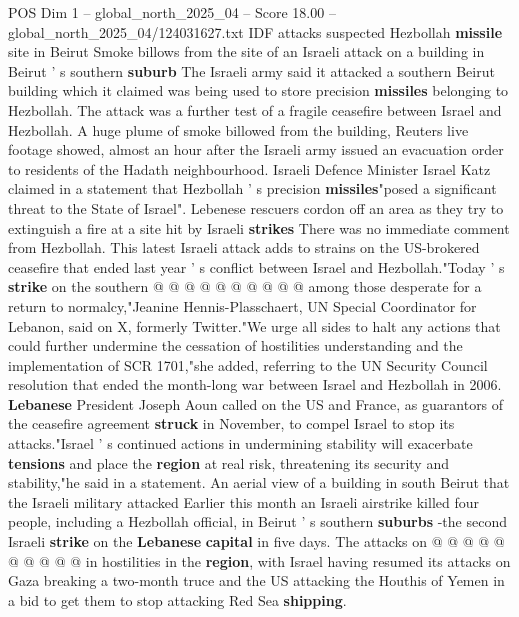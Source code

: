 \begin{textsample}{POS Dim 1 – global\_north\_2025\_04 – Score 18.00 – global\_north\_2025\_04/124031627.txt}  \label{ex:f1_pos_412}
IDF attacks suspected Hezbollah \textbf{missile} site in Beirut Smoke billows from the site of an Israeli attack on a building in Beirut ' s southern \textbf{suburb} The Israeli army said it attacked a southern Beirut building which it claimed was being used to store precision \textbf{missiles} belonging to Hezbollah.
The attack was a further test of a fragile ceasefire between Israel and Hezbollah.
A huge plume of smoke billowed from the building, Reuters live footage showed, almost an hour after the Israeli army issued an evacuation order to residents of the Hadath neighbourhood.
Israeli Defence Minister Israel Katz claimed in a statement that Hezbollah ' s precision \textbf{missiles}"posed a significant threat to the State of Israel".
Lebenese rescuers cordon off an area as they try to extinguish a fire at a site hit by Israeli \textbf{strikes} There was no immediate comment from Hezbollah.
This latest Israeli attack adds to strains on the US-brokered ceasefire that ended last year ' s conflict between Israel and Hezbollah."Today ' s \textbf{strike} on the southern @ @ @ @ @ @ @ @ @ @ among those desperate for a return to normalcy,"Jeanine Hennis-Plasschaert, UN Special Coordinator for Lebanon, said on X, formerly Twitter."We urge all sides to halt any actions that could further undermine the cessation of hostilities understanding and the implementation of SCR 1701,"she added, referring to the UN Security Council resolution that ended the month-long war between Israel and Hezbollah in 2006. \textbf{Lebanese} President Joseph Aoun called on the US and France, as guarantors of the ceasefire agreement \textbf{struck} in November, to compel Israel to stop its attacks."Israel ' s continued actions in undermining stability will exacerbate \textbf{tensions} and place the \textbf{region} at real risk, threatening its security and stability,"he said in a statement.
An aerial view of a building in south Beirut that the Israeli military attacked Earlier this month an Israeli airstrike killed four people, including a Hezbollah official, in Beirut ' s southern \textbf{suburbs} -the second Israeli \textbf{strike} on the \textbf{Lebanese} \textbf{capital} in five days.
The attacks on @ @ @ @ @ @ @ @ @ @ in hostilities in the \textbf{region}, with Israel having resumed its attacks on Gaza breaking a two-month truce and the US attacking the Houthis of Yemen in a bid to get them to stop attacking Red Sea \textbf{shipping}.

\end{textsample}
